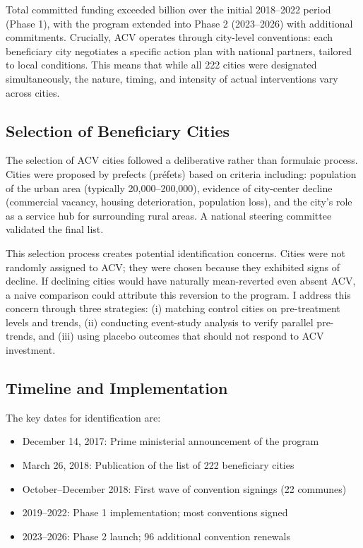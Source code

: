 \documentclass[12pt]{article}
\newcommand{\euro}{\texteuro}
\begin{document}
Total committed funding exceeded \euro 5 billion over the initial 2018--2022 period (Phase 1), with the program extended into Phase 2 (2023--2026) with additional commitments. Crucially, ACV operates through city-level conventions: each beneficiary city negotiates a specific action plan with national partners, tailored to local conditions. This means that while all 222 cities were designated simultaneously, the nature, timing, and intensity of actual interventions vary across cities.

\subsection{Selection of Beneficiary Cities}

The selection of ACV cities followed a deliberative rather than formulaic process. Cities were proposed by prefects (pr\'{e}fets) based on criteria including: population of the urban area (typically 20,000--200,000), evidence of city-center decline (commercial vacancy, housing deterioration, population loss), and the city's role as a service hub for surrounding rural areas. A national steering committee validated the final list.

This selection process creates potential identification concerns. Cities were not randomly assigned to ACV; they were chosen because they exhibited signs of decline. If declining cities would have naturally mean-reverted even absent ACV, a naive comparison could attribute this reversion to the program. I address this concern through three strategies: (i) matching control cities on pre-treatment levels and trends, (ii) conducting event-study analysis to verify parallel pre-trends, and (iii) using placebo outcomes that should not respond to ACV investment.

\subsection{Timeline and Implementation}

The key dates for identification are:
\begin{itemize}
    \item December 14, 2017: Prime ministerial announcement of the program
    \item March 26, 2018: Publication of the list of 222 beneficiary cities
    \item October--December 2018: First wave of convention signings (22 communes)
    \item 2019--2022: Phase 1 implementation; most conventions signed
    \item 2023--2026: Phase 2 launch; 96 additional convention renewals
\end{itemize}
\end{document}
